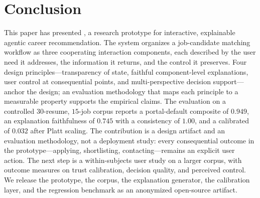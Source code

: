\section{Conclusion}\label{sec:9}

This paper has presented \JobMatch, a research prototype for interactive, explainable agentic career recommendation.
The system organizes a job-candidate matching workflow as three cooperating interaction components, each described by the user need it addresses, the information it returns, and the control it preserves.
Four design principles---transparency of state, faithful component-level explanations, user control at consequential points, and multi-perspective decision support---anchor the design; an evaluation methodology that maps each principle to a measurable property supports the empirical claims.
The evaluation on a controlled $30$-resume, $15$-job corpus reports a portal-default composite \ndcg{} of $0.949$, an explanation faithfulness of $0.745$ with a consistency of $1.00$, and a calibrated \ece{} of $0.032$ after Platt scaling.
The contribution is a design artifact and an evaluation methodology, not a deployment study: every consequential outcome in the prototype---applying, shortlisting, contacting---remains an explicit user action.
The next step is a within-subjects user study on a larger corpus, with outcome measures on trust calibration, decision quality, and perceived control.
We release the prototype, the corpus, the explanation generator, the calibration layer, and the regression benchmark as an anonymized open-source artifact.
